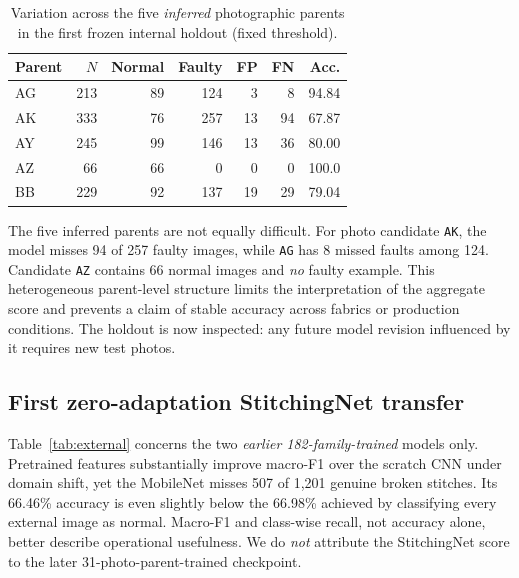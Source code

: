 \documentclass[conference,a4paper]{IEEEtran}
\begin{document}
\begin{table}[!t]\centering
\caption{Variation across the five \emph{inferred} photographic parents in the first frozen internal holdout (fixed threshold).}\label{tab:parents}
\setlength{\tabcolsep}{3.2pt}\footnotesize
\begin{tabular}{lrrrrrr}\toprule
Parent & $N$ & Normal & Faulty & FP & FN & Acc.\\\midrule
AG & 213 & 89 & 124 & 3 & 8 & 94.84\\
AK & 333 & 76 & 257 & 13 & 94 & 67.87\\
AY & 245 & 99 & 146 & 13 & 36 & 80.00\\
AZ & 66 & 66 & 0 & 0 & 0 & 100.0\\
BB & 229 & 92 & 137 & 19 & 29 & 79.04\\\bottomrule
\end{tabular}
\end{table}

The five inferred parents are not equally difficult. For photo candidate \texttt{AK}, the model misses 94 of 257 faulty images, while \texttt{AG} has 8 missed faults among 124. Candidate \texttt{AZ} contains 66 normal images and \emph{no} faulty example. This heterogeneous parent-level structure limits the interpretation of the aggregate score and prevents a claim of stable accuracy across fabrics or production conditions. The holdout is now inspected: any future model revision influenced by it requires new test photos.

\subsection{First zero-adaptation StitchingNet transfer}
Table~\ref{tab:external} concerns the two \emph{earlier 182-family-trained} models only. Pretrained features substantially improve macro-F1 over the scratch CNN under domain shift, yet the MobileNet misses 507 of 1,201 genuine broken stitches. Its 66.46\% accuracy is even slightly below the 66.98\% achieved by classifying every external image as normal. Macro-F1 and class-wise recall, not accuracy alone, better describe operational usefulness. We do \emph{not} attribute the StitchingNet score to the later 31-photo-parent-trained checkpoint.
\end{document}
